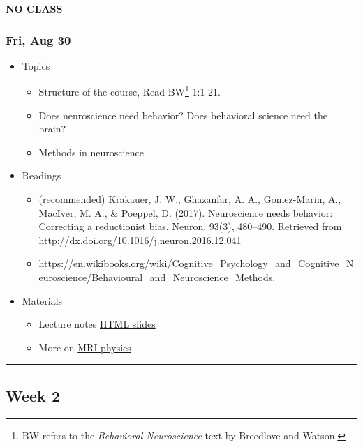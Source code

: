 \documentclass[]{article}
\providecommand{\tightlist}{%
  \setlength{\itemsep}{0pt}\setlength{\parskip}{0pt}}
\let\rmarkdownfootnote\footnote%
\def\footnote{\protect\rmarkdownfootnote}
\begin{document}
\textbf{NO CLASS}

\hypertarget{fri-aug-30}{%
\subsubsection{Fri, Aug 30}\label{fri-aug-30}}

\begin{itemize}
\tightlist
\item
  Topics

  \begin{itemize}
  \tightlist
  \item
    Structure of the course, Read BW\footnote{BW refers to the
      \emph{Behavioral Neuroscience} text by Breedlove and Watson.}
    1:1-21.
  \item
    Does neuroscience need behavior? Does behavioral science need the
    brain?
  \item
    Methods in neuroscience
  \end{itemize}
\item
  Readings

  \begin{itemize}
  \tightlist
  \item
    (recommended) Krakauer, J. W., Ghazanfar, A. A., Gomez-Marin, A.,
    MacIver, M. A., \& Poeppel, D. (2017). Neuroscience needs behavior:
    Correcting a reductionist bias. Neuron, 93(3), 480--490. Retrieved
    from \url{http://dx.doi.org/10.1016/j.neuron.2016.12.041}
  \item
    \url{https://en.wikibooks.org/wiki/Cognitive_Psychology_and_Cognitive_Neuroscience/Behavioural_and_Neuroscience_Methods}.
  \end{itemize}
\item
  Materials

  \begin{itemize}
  \tightlist
  \item
    Lecture notes \textbar{}
    \href{lectures/511-2019-08-30-intro-methods.html}{HTML slides}
  \item
    More on \href{https://www.youtube.com/watch?v=Ok9ILIYzmaY}{MRI
    physics}
  \end{itemize}
\end{itemize}

\begin{center}\rule{0.5\linewidth}{\linethickness}\end{center}

\hypertarget{week-2}{%
\subsection{Week 2}\label{week-2}}
\end{document}
